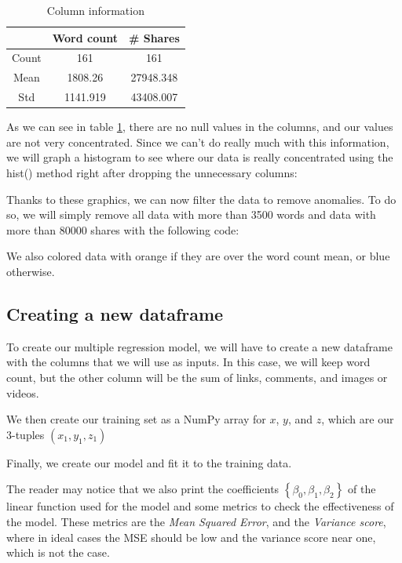 \documentclass[10pt]{article}
\begin{document}
\begin{table}[!ht]
  \centering
  \caption{Column information}
  \label{col_info}
    \begin{tabular}{|c|c|c|}
      \hline
       & Word count & \# Shares \\
      \hline
      Count & 161 & 161 \\
      \hline
      Mean & 1808.26 & 27948.348 \\
      \hline
      Std & 1141.919 & 43408.007 \\
      \hline
    \end{tabular}
\end{table}

As we can see in table \ref{col_info}, there are no null values in the columns, and our values are not very concentrated. Since we can't do really much with this information, we will graph a histogram to see where our data is really concentrated using the hist() method right after dropping the unnecessary columns: \par

Thanks to these graphics, we can now filter the data to remove anomalies. To do so, we will simply remove all data with more than 3500 words and data with more than 80000 shares with the following code: \par

We also colored data with orange if they are over the word count mean, or blue otherwise.

\subsection{Creating a new dataframe}
To create our multiple regression model, we will have to create a new dataframe with the columns that we will use as inputs. In this case, we will keep word count, but the other column will be the sum of links, comments, and images or videos. \par

We then create our training set as a NumPy array for $x$, $y$, and $z$, which are our 3-tuples $(x_{1}, y_{1}, z_{1})$

Finally, we create our model and fit it to the training data.

The reader may notice that we also print the coefficients $\left\{\beta_{0}, \beta_{1}, \beta_{2}\right\}$ of the linear function used for the model and some metrics to check the effectiveness of the model. These metrics are the \textit{Mean Squared Error}, and the \textit{Variance score}, where in ideal cases the MSE should be low and the variance score near one, which is not the case.
\end{document}
